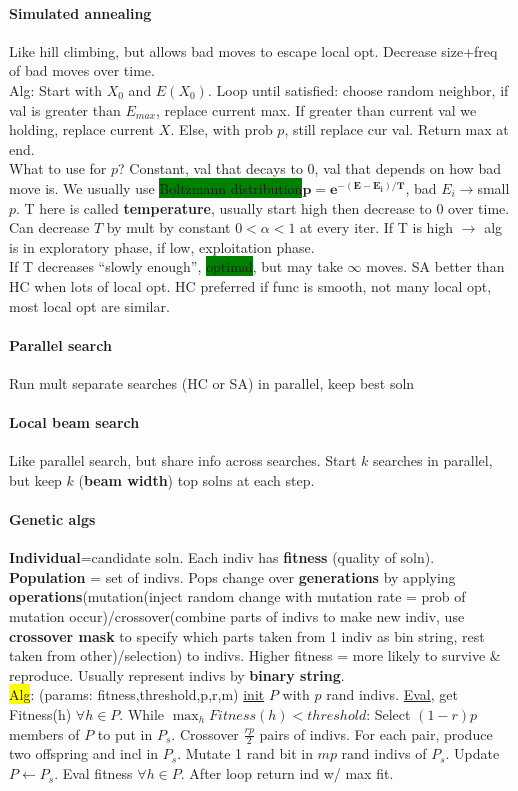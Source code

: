 \paragraph{Simulated annealing} Like hill climbing, but allows bad
moves to escape local opt. Decrease size+freq of bad moves over
time. \\Alg: Start with $X_0$ and $E(X_0)$. Loop until satisfied:
choose random neighbor, if val is greater than $E_{max}$, replace
current max. If greater than current val we holding, replace current
$X$. Else, with prob $p$, still replace cur val. Return max at end.
\\ What to use for $p$? Constant, val that decays to $0$, val that
depends on how bad move is. We usually use \colorbox{green}{Boltzmann
  distribution}$\mathbf{p = e^{-(E-E_i)/T}}$, bad $E_i \to $small
$p$. T here is called \textbf{temperature}, usually start high then
decrease to 0 over time. Can decrease $T$ by mult by constant $0 <
\alpha < 1$ at every iter. If T is high $\to$ alg is in exploratory
phase, if low, exploitation phase.
\\ If T decreases ``slowly enough'', \colorbox{green}{optimal}, but
may take $\infty$ moves. SA better than HC when lots of local opt. HC
preferred if func is smooth, not many local opt, most local opt are
similar.
\paragraph{Parallel search} Run mult separate searches (HC or SA) in
parallel, keep best soln
\paragraph{Local beam search} Like parallel search, but share info
across searches. Start $k$ searches in parallel, but keep $k$
(\textbf{beam width}) top
solns at each step.
\paragraph{Genetic algs} \textbf{Individual}=candidate soln. Each
indiv has \textbf{fitness} (quality of soln). \textbf{Population} =
set of indivs. Pops change over \textbf{generations} by applying
\textbf{operations}(mutation(inject random change with mutation rate =
prob of mutation occur)/crossover(combine parts of indivs to make new
indiv, use \textbf{crossover mask} to specify which parts taken from 1
indiv as bin string, rest taken from other)/selection) to indivs. Higher
fitness = more likely to survive \& reproduce. Usually represent
indivs by \textbf{binary string}.
\\ \colorbox{yellow}{Alg}: (params: fitness,threshold,p,r,m) \underline{init} $P$ with
$p$ rand indivs. \underline{Eval}, get Fitness(h) $\forall h \in
P$. While $\max_h Fitness(h)<threshold$: Select $(1-r)p$ members of
$P$ to put in $P_s$. Crossover $\frac{rp}{2}$ pairs of indivs. For
each pair, produce two offspring and incl in $P_s$. Mutate 1 rand bit
in $mp$ rand indivs of $P_s$. Update $P \gets P_s$. Eval fitness
$\forall h \in P$. After loop return ind w/ max fit.
